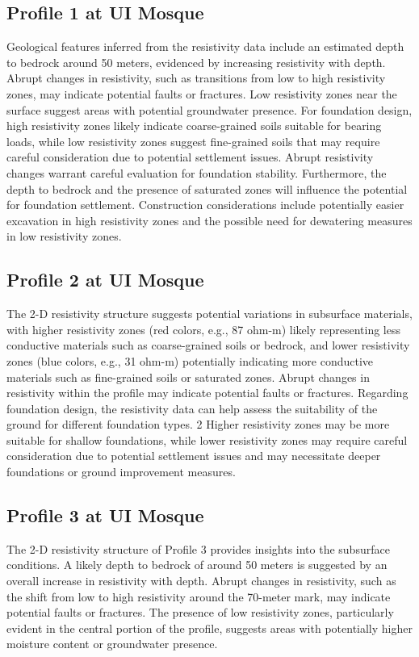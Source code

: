 \documentclass[12pt,a4paper]{report}
\begin{document}
\subsection{Profile 1 at UI Mosque}
Geological features inferred from the resistivity data include an estimated depth to bedrock around 50 meters, evidenced by increasing resistivity with depth. Abrupt changes in resistivity, such as transitions from low to high resistivity zones, may indicate potential faults or fractures. Low resistivity zones near the surface suggest areas with potential groundwater presence. For foundation design, high resistivity zones likely indicate coarse-grained soils suitable for bearing loads, while low resistivity zones suggest fine-grained soils that may require careful consideration due to potential settlement issues. Abrupt resistivity changes warrant careful evaluation for foundation stability. Furthermore, the depth to bedrock and the presence of saturated zones will influence the potential for foundation settlement. Construction considerations include potentially easier excavation in high resistivity zones and the possible need for dewatering measures in low resistivity zones.

\subsection{Profile 2 at UI Mosque}
The 2-D resistivity structure suggests potential variations in subsurface materials, with higher resistivity zones (red colors, e.g., 87 ohm-m) likely representing less conductive materials such as coarse-grained soils or bedrock, and lower resistivity zones (blue colors, e.g., 31 ohm-m) potentially indicating more conductive materials such as fine-grained soils or saturated zones. Abrupt changes in resistivity within the profile may indicate potential faults or fractures. Regarding foundation design, the resistivity data can help assess the suitability of the ground for different foundation types. 2  Higher resistivity zones may be more suitable for shallow foundations, while lower resistivity zones may require careful consideration due to potential settlement issues and may necessitate deeper foundations or ground improvement measures.

\subsection{Profile 3 at UI Mosque}
The 2-D resistivity structure of Profile 3 provides insights into the subsurface conditions. A likely depth to bedrock of around 50 meters is suggested by an overall increase in resistivity with depth. Abrupt changes in resistivity, such as the shift from low to high resistivity around the 70-meter mark, may indicate potential faults or fractures. The presence of low resistivity zones, particularly evident in the central portion of the profile, suggests areas with potentially higher moisture content or groundwater presence.
\end{document}
